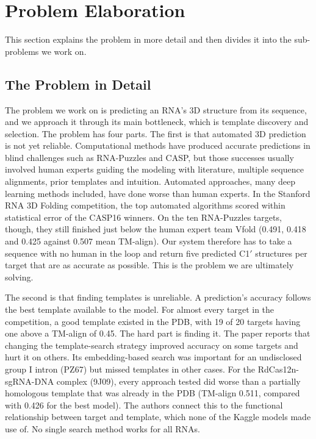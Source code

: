 \documentclass{FastFyp}
\begin{document}
\section{Problem Elaboration}
This section explains the problem in more detail and then divides it into the sub-problems we work on.

\subsection{The Problem in Detail}
The problem we work on is predicting an RNA's 3D structure from its sequence, and we approach it through its main bottleneck, which is template discovery and selection. The problem has four parts. The first is that automated 3D prediction is not yet reliable. Computational methods have produced accurate predictions in blind challenges such as RNA-Puzzles and CASP, but those successes usually involved human experts guiding the modeling with literature, multiple sequence alignments, prior templates and intuition. Automated approaches, many deep learning methods included, have done worse than human experts. In the Stanford RNA 3D Folding competition, the top automated algorithms scored within statistical error of the CASP16 winners. On the ten RNA-Puzzles targets, though, they still finished just below the human expert team Vfold (0.491, 0.418 and 0.425 against 0.507 mean TM-align). Our system therefore has to take a sequence with no human in the loop and return five predicted C1$'$ structures per target that are as accurate as possible. This is the problem we are ultimately solving.

The second is that finding templates is unreliable. A prediction's accuracy follows the best template available to the model. For almost every target in the competition, a good template existed in the PDB, with 19 of 20 targets having one above a TM-align of 0.45. The hard part is finding it. The paper reports that changing the template-search strategy improved accuracy on some targets and hurt it on others. Its embedding-based search was important for an undisclosed group I intron (PZ67) but missed templates in other cases. For the RdCas12n-sgRNA-DNA complex (9J09), every approach tested did worse than a partially homologous template that was already in the PDB (TM-align 0.511, compared with 0.426 for the best model). The authors connect this to the functional relationship between target and template, which none of the Kaggle models made use of. No single search method works for all RNAs.
\end{document}
